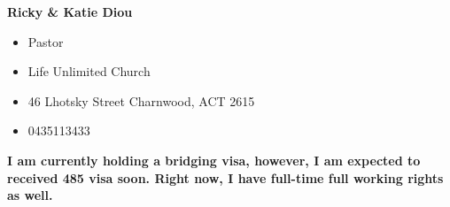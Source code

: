 \documentclass[11pt, a4paper]{awesome-cv}
\begin{document}
\begin{cvletter}
\textbf{Ricky \& Katie Diou}
\begin{itemize}
	\item Pastor
	\item Life Unlimited Church
	\item 46 Lhotsky Street Charnwood, ACT 2615
	\item 0435113433
\end{itemize}


\textbf{I am currently holding a bridging visa, however,  I am expected to received 485 visa soon. Right now, I have full-time full working rights as well.}
\end{cvletter}


\makeletterclosing
\end{document}
